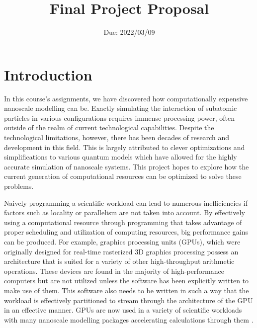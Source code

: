 \documentclass[10pt, oneside, letterpaper]{article}
\title{Final Project Proposal}
\author{}
\date{Due: 2022/03/09}
\begin{document}
\maketitle
\thispagestyle{fancy}

\section{Introduction}

In this course's assignments, we have discovered how computationally expensive nanoscale modelling can be. Exactly simulating the interaction of subatomic particles in various configurations requires immense processing power, often outside of the realm of current technological capabilities. Despite the technological limitations, however, there has been decades of research and development in this field. This is largely attributed to clever optimizations and simplifications to various quantum models which have allowed for the highly accurate simulation of nanoscale systems. This project hopes to explore how the current generation of computational resources can be optimized to solve these problems.

Naively programming a scientific workload can lead to numerous inefficiencies if factors such as locality or parallelism are not taken into account. By effectively using a computational resource through programming that takes advantage of proper scheduling and utilization of computing resources, big performance gains can be produced. For example, graphics processing units (GPUs), which were originally designed for real-time rasterized 3D graphics processing possess an architecture that is suited for a variety of other high-throughput arithmetic operations. These devices are found in the majority of high-performance computers but are not utilized unless the software has been explicitly written to make use of them. This software also needs to be written in such a way that the workload is effectively partitioned to stream through the architecture of the GPU in an effective manner. GPUs are now used in a variety of scientific workloads with many nanoscale modelling packages accelerating calculations through them \cite{electronic-structure-calculations-on-gpus}.
\end{document}
